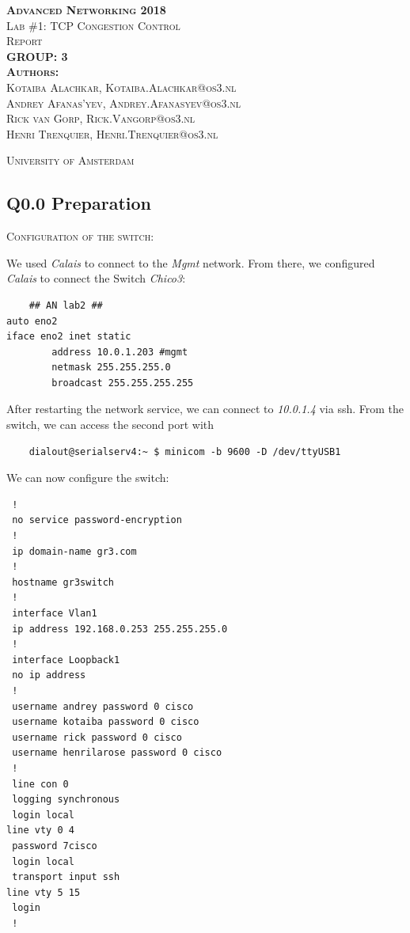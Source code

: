 \documentclass{article}
\begin{document}
\begin{titlepage}
\begin{center}
\textsc{\huge \bfseries Advanced Networking 2018}\\[1.5cm]
\textsc{\large Lab \#1: TCP Congestion Control}\\[1.5cm]
\textsc{\huge Report}\\[1.5cm]
\textsc{\huge \bfseries GROUP: 3}\\[1.5cm]
\textsc{\large{\textbf{Authors:}\\ 
Kotaiba Alachkar, Kotaiba.Alachkar@os3.nl\\ Andrey Afanas'yev, Andrey.Afanasyev@os3.nl\\
Rick van Gorp, Rick.Vangorp@os3.nl\\
Henri Trenquier, Henri.Trenquier@os3.nl
}}

\textsc{\large University of Amsterdam}
\end{center}
\end{titlepage}
\subsection{Q0.0 Preparation}

\textsc{\large Configuration of the switch:}

We used \textit{Calais} to connect to the \textit{Mgmt} network.
From there, we configured \textit{Calais} to connect the Switch \textit{Chico3}:

\begin{verbatim}
    ## AN lab2 ##
auto eno2
iface eno2 inet static
        address 10.0.1.203 #mgmt
        netmask 255.255.255.0
        broadcast 255.255.255.255
\end{verbatim}

After restarting the network service, we can connect to \textit{10.0.1.4} via ssh.
From the switch, we can access the second port with
\begin{verbatim}
    dialout@serialserv4:~ $ minicom -b 9600 -D /dev/ttyUSB1
\end{verbatim}

We can now configure the switch:
\begin{verbatim}
 !
 no service password-encryption
 !
 ip domain-name gr3.com
 !
 hostname gr3switch
 !
 interface Vlan1
 ip address 192.168.0.253 255.255.255.0
 !
 interface Loopback1
 no ip address
 !
 username andrey password 0 cisco
 username kotaiba password 0 cisco
 username rick password 0 cisco
 username henrilarose password 0 cisco
 !
 line con 0
 logging synchronous
 login local
line vty 0 4
 password 7cisco
 login local
 transport input ssh
line vty 5 15
 login
 !
\end{verbatim}
\end{document}
